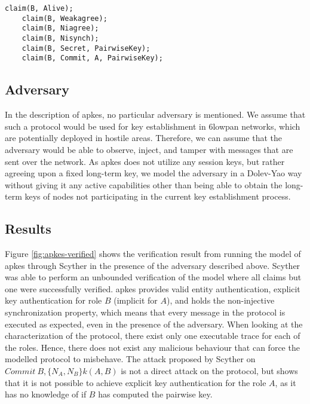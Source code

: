 \begin{lstlisting}[caption={Security claims for role B in APKES.}, label={lst:claims-b-apkes}, style=code-listings]
	claim(B, Alive);
	claim(B, Weakagree);
	claim(B, Niagree);
	claim(B, Nisynch);
	claim(B, Secret, PairwiseKey);
	claim(B, Commit, A, PairwiseKey);
\end{lstlisting}


\subsection{Adversary}

In the description of \gls{apkes}, no particular adversary is mentioned. We assume that such a protocol would be used for key establishment in \gls{6lowpan} networks, which are potentially deployed in hostile areas. Therefore, we can assume that the adversary would be able to observe, inject, and tamper with messages that are sent over the network. As \gls{apkes} does not utilize any session keys, but rather agreeing upon a fixed long-term key, we model the adversary in a Dolev-Yao way without giving it any active capabilities other than being able to obtain the long-term keys of nodes not participating in the current key establishment process. 

\subsection{Results}

Figure \ref{fig:apkes-verified} shows the verification result from running the model of \gls{apkes} through Scyther in the presence of the adversary described above. Scyther was able to perform an unbounded verification of the model where all claims but one were successfully verified. \gls{apkes} provides valid entity authentication, explicit key authentication for role $B$ (implicit for $A$), and holds the non-injective synchronization property, which means that every message in the protocol is executed as expected, even in the presence of the adversary. When looking at the characterization of the protocol, there exist only one executable trace for each of the roles. Hence, there does not exist any malicious behaviour that can force the modelled protocol to misbehave. The attack proposed by Scyther on $Commit\ B, \{N_A, N_B\}k(A,B)$ is not a direct attack on the protocol, but shows that it is not possible to achieve explicit key authentication for the role $A$, as it has no knowledge of if $B$ has computed the pairwise key. 


